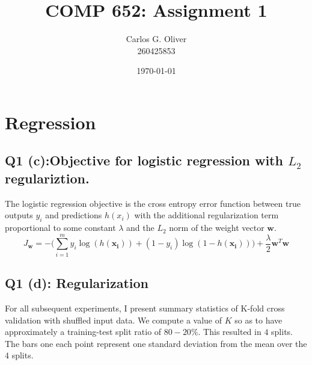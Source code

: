 \documentclass[11pt]{amsart}
\title{COMP 652: Assignment 1}
\author{Carlos G. Oliver \\ 260425853}
\date{\today}                                           %
\newcommand{\vek}[1]{\mathbf{#1}}
\begin{document}
\maketitle
\section{Regression}
\subsection{Q1 (c):Objective for logistic regression with $L_{2}$ regulariztion.}

The logistic regression objective is the cross entropy error function between true outputs $y_i$ and predictions $h(x_i)$ with the additional regularization term proportional to some constant $\lambda$ and the $L_2$ norm of the weight vector $\vek{w}$.
\begin{equation}
J_{\vek{w}} =  -\bigg(\sum_{i=1}^{m} y_{i}\log(h(\vek{x_{i}})) + (1 - y_{i})\log(1 - h(\vek{x_{i}}))\bigg) + \frac{\lambda}{2}\vek{w}^T\vek{w}
\end{equation}

\subsection{Q1 (d): Regularization}

For all subsequent experiments, I present summary statistics of K-fold cross validation with shuffled input data. We compute a value of $K$ so as to have approximately a training-test split ratio of $80-20\%$. This resulted in $4$ splits. The bars one each point represent one standard deviation from the mean over the $4$ splits. 
\end{document}
